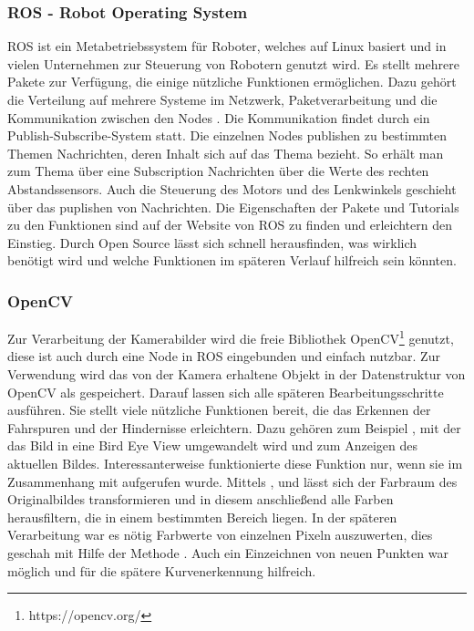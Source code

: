 \subsubsection{ROS - Robot Operating System}
\label{sec:ros}
ROS ist ein Metabetriebssystem für Roboter, welches auf Linux basiert und in vielen Unternehmen zur Steuerung von Robotern genutzt wird. Es stellt mehrere Pakete zur Verfügung, die einige nützliche Funktionen ermöglichen. Dazu gehört die Verteilung auf mehrere Systeme im Netzwerk, Paketverarbeitung und die Kommunikation zwischen den Nodes \cite{einfuehrungROS}.
Die Kommunikation findet durch ein Publish-Subscribe-System statt. Die einzelnen Nodes publishen zu  bestimmten Themen Nachrichten, deren Inhalt sich auf das Thema bezieht. So erhält man zum Thema  über eine Subscription Nachrichten über die Werte des rechten Abstandssensors. Auch die Steuerung des Motors und des Lenkwinkels geschieht über das puplishen von Nachrichten. 
Die Eigenschaften der Pakete und Tutorials zu den Funktionen sind auf der Website von ROS zu finden und erleichtern den Einstieg. Durch Open Source lässt sich schnell herausfinden, was wirklich benötigt wird und welche Funktionen im späteren Verlauf hilfreich sein könnten.

\subsubsection{OpenCV}
\label{sec:openCV}
Zur Verarbeitung der Kamerabilder wird die freie Bibliothek OpenCV\footnote{https://opencv.org/} genutzt, diese ist auch durch eine Node in ROS eingebunden und einfach nutzbar. Zur Verwendung wird das von der Kamera erhaltene Objekt in der Datenstruktur von OpenCV als  gespeichert. Darauf lassen sich alle späteren Bearbeitungsschritte ausführen. 
Sie stellt viele nützliche Funktionen bereit, die das Erkennen der Fahrspuren und der Hindernisse erleichtern. Dazu gehören zum Beispiel , mit der das Bild in eine Bird Eye View umgewandelt wird und  zum Anzeigen des aktuellen Bildes. Interessanterweise funktionierte diese Funktion nur, wenn sie im Zusammenhang mit  aufgerufen wurde. 
Mittels ,  und  lässt sich der Farbraum des Originalbildes transformieren und in diesem anschließend alle Farben herausfiltern, die in einem bestimmten Bereich liegen. 
In der späteren Verarbeitung war es nötig Farbwerte von einzelnen Pixeln auszuwerten, dies geschah mit Hilfe der Methode . Auch ein Einzeichnen von neuen Punkten war möglich und für die spätere Kurvenerkennung hilfreich. 

